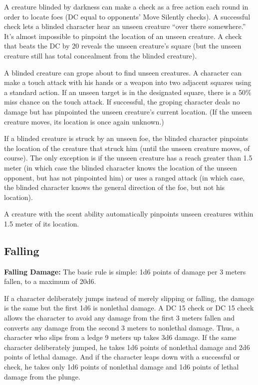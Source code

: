 A creature blinded by darkness can make a  check as a free action each round in order to locate foes (DC equal to opponents' Move Silently checks). A successful check lets a blinded character hear an unseen creature ``over there somewhere.'' It's almost impossible to pinpoint the location of an unseen creature. A  check that beats the DC by 20 reveals the unseen creature's square (but the unseen creature still has total concealment from the blinded creature).

\begin{itemize*}
\item A blinded creature can grope about to find unseen creatures. A character can make a touch attack with his hands or a weapon into two adjacent squares using a standard action. If an unseen target is in the designated square, there is a 50\% miss chance on the touch attack. If successful, the groping character deals no damage but has pinpointed the unseen creature's current location. (If the unseen creature moves, its location is once again unknown.)
\item If a blinded creature is struck by an unseen foe, the blinded character pinpoints the location of the creature that struck him (until the unseen creature moves, of course). The only exception is if the unseen creature has a reach greater than 1.5 meter (in which case the blinded character knows the location of the unseen opponent, but has not pinpointed him) or uses a ranged attack (in which case, the blinded character knows the general direction of the foe, but not his location).
\item A creature with the scent ability automatically pinpoints unseen creatures within 1.5 meter of its location.
\end{itemize*}


\subsection{Falling}
\textbf{Falling Damage:} The basic rule is simple: 1d6 points of damage per 3 meters fallen, to a maximum of 20d6.

If a character deliberately jumps instead of merely slipping or falling, the damage is the same but the first 1d6 is nonlethal damage. A DC 15  check or DC 15  check allows the character to avoid any damage from the first 3 meters fallen and converts any damage from the second 3 meters to nonlethal damage. Thus, a character who slips from a ledge 9 meters up takes 3d6 damage. If the same character deliberately jumped, he takes 1d6 points of nonlethal damage and 2d6 points of lethal damage. And if the character leaps down with a successful  or  check, he takes only 1d6 points of nonlethal damage and 1d6 points of lethal damage from the plunge.

